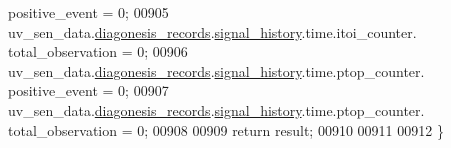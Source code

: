 \begin{DoxyCode}
      positive\_event      = 0;
00905     uv\_sen\_data.\hyperlink{a00035_a7ae905b560513ad201e58c2f63375030}{diagonesis\_records}.\hyperlink{a00017_affb63906d23cb1cb7787d61eaaedfb60}{signal\_history}.time.itoi\_counter.
      total\_observation   = 0;
00906     uv\_sen\_data.\hyperlink{a00035_a7ae905b560513ad201e58c2f63375030}{diagonesis\_records}.\hyperlink{a00017_affb63906d23cb1cb7787d61eaaedfb60}{signal\_history}.time.ptop\_counter.
      positive\_event      = 0;
00907     uv\_sen\_data.\hyperlink{a00035_a7ae905b560513ad201e58c2f63375030}{diagonesis\_records}.\hyperlink{a00017_affb63906d23cb1cb7787d61eaaedfb60}{signal\_history}.time.ptop\_counter.
      total\_observation   = 0;
00908 
00909     \textcolor{keywordflow}{return} result;
00910 
00911 
00912 \}
\end{DoxyCode}
